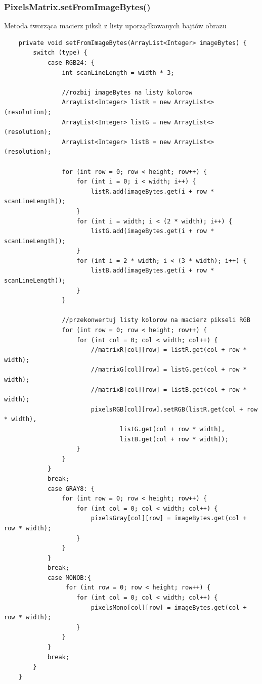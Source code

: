 \documentclass{article}
\begin{document}
	\subsubsection{PixelsMatrix.setFromImageBytes()}
	Metoda tworząca macierz piksli z listy uporządkowanych bajtów obrazu
	\begin{verbatim}
	private void setFromImageBytes(ArrayList<Integer> imageBytes) {
        switch (type) {
            case RGB24: {
                int scanLineLength = width * 3;

                //rozbij imageBytes na listy kolorow
                ArrayList<Integer> listR = new ArrayList<>(resolution);
                ArrayList<Integer> listG = new ArrayList<>(resolution);
                ArrayList<Integer> listB = new ArrayList<>(resolution);

                for (int row = 0; row < height; row++) {
                    for (int i = 0; i < width; i++) {
                        listR.add(imageBytes.get(i + row * scanLineLength));
                    }
                    for (int i = width; i < (2 * width); i++) {
                        listG.add(imageBytes.get(i + row * scanLineLength));
                    }
                    for (int i = 2 * width; i < (3 * width); i++) {
                        listB.add(imageBytes.get(i + row * scanLineLength));
                    }
                }

                //przekonwertuj listy kolorow na macierz pikseli RGB
                for (int row = 0; row < height; row++) {
                    for (int col = 0; col < width; col++) {
                        //matrixR[col][row] = listR.get(col + row * width);
                        //matrixG[col][row] = listG.get(col + row * width);
                        //matrixB[col][row] = listB.get(col + row * width);
                        pixelsRGB[col][row].setRGB(listR.get(col + row * width),
                                listG.get(col + row * width),
                                listB.get(col + row * width));
                    }
                }
            }
            break;
            case GRAY8: {
                for (int row = 0; row < height; row++) {
                    for (int col = 0; col < width; col++) {
                        pixelsGray[col][row] = imageBytes.get(col + row * width);
                    }
                }
            }
            break;
            case MONOB:{
                 for (int row = 0; row < height; row++) {
                    for (int col = 0; col < width; col++) {
                        pixelsMono[col][row] = imageBytes.get(col + row * width);
                    }
                }
            }
            break;
        }
    }

	\end{verbatim}
	
\end{document}
